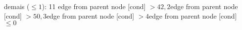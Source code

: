 {{{{{%
demais ($\leq 1$): 11} edge from parent node [cond] {$>42,2$}}edge from parent node [cond] {$>50,3$}}edge from parent node [cond] {$>4$}}edge from parent node [cond] {$\leq0$}}
